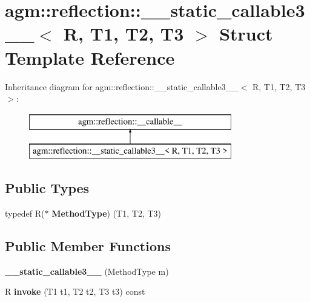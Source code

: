 \hypertarget{structagm_1_1reflection_1_1____static__callable3____}{}\section{agm\+:\+:reflection\+:\+:\+\_\+\+\_\+static\+\_\+callable3\+\_\+\+\_\+$<$ R, T1, T2, T3 $>$ Struct Template Reference}
\label{structagm_1_1reflection_1_1____static__callable3____}
Inheritance diagram for agm\+:\+:reflection\+:\+:\+\_\+\+\_\+static\+\_\+callable3\+\_\+\+\_\+$<$ R, T1, T2, T3 $>$\+:\begin{figure}[H]
\begin{center}
\leavevmode
\includegraphics[height=2.000000cm]{structagm_1_1reflection_1_1____static__callable3____}
\end{center}
\end{figure}
\subsection*{Public Types}
\begin{DoxyCompactItemize}
\item 
typedef R($\ast$ {\bfseries Method\+Type}) (T1, T2, T3)\hypertarget{structagm_1_1reflection_1_1____static__callable3_____a637766eb6ef0de7583f31e66479ba223}{}\label{structagm_1_1reflection_1_1____static__callable3_____a637766eb6ef0de7583f31e66479ba223}

\end{DoxyCompactItemize}
\subsection*{Public Member Functions}
\begin{DoxyCompactItemize}
\item 
{\bfseries \+\_\+\+\_\+static\+\_\+callable3\+\_\+\+\_\+} (Method\+Type m)\hypertarget{structagm_1_1reflection_1_1____static__callable3_____aa0b999f74f95aafb443897caf4524d61}{}\label{structagm_1_1reflection_1_1____static__callable3_____aa0b999f74f95aafb443897caf4524d61}

\item 
R {\bfseries invoke} (T1 t1, T2 t2, T3 t3) const \hypertarget{structagm_1_1reflection_1_1____static__callable3_____ac2320be791255bcd68ba6955c926f129}{}\label{structagm_1_1reflection_1_1____static__callable3_____ac2320be791255bcd68ba6955c926f129}

\end{DoxyCompactItemize}
